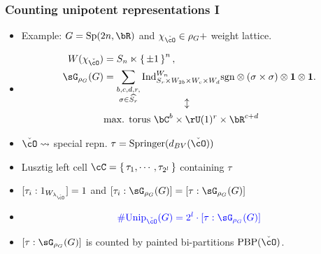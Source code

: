 \documentclass[t,11pt,usenames,dvipsnames]{beamer}
\theoremstyle{plain}
\theoremstyle{definition}
\newcommand{\bfone}{\mathbf{1}}
\def\sgn{{\rm sgn}}
\def\Ind{{\rm Ind}}
\def\Sp{{\mathrm{Sp}}}
\def\Unip{{\mathrm{Unip}}}
\def\ckcO{{\check{\cO}}}
\def\Nil{\mathrm{Nil}}
\def\lblue{\color{blue}}
\def\vcO{\check{\cO}}
\def\PBP{\mathrm{PBP}}
\def\LS{\mathrm{LS}}
\def\AOD{\mathrm{AOD}}
\def\Spr{\mathrm{Springer}}
\begin{document}
    \begin{frame}
        \frametitle{Counting unipotent representations I}
        \begin{itemize}[<+->]
            \item Example: $G = \Sp(2n,\bR)$ and  $\chi_{\ckcO}\in \rho_G +$ weight lattice. %

            \item[] \vspace{-1em} 
            \[
              \begin{split}
              W(\chi_{\ckcO}) &= S_n \ltimes \set{\pm 1}^n,\\ 
            \sG_{\rho_G}(G) &= \sum_{\substack{b,c,d,r,\\
            \sigma\in \widehat{S_r}}} \Ind_{S_r\times W_{2b}\times W_c\times
            W_d}^{W_n} \sgn\otimes(\sigma\times \sigma)\otimes \bfone\otimes \bfone .\\[-1em]
            & \hspace{8em}\updownarrow\\
            & \text{max. torus }\bC^b \times \rU(1)^r \times \bR^{c+d} 
              \end{split}
           \] 
            \item[] \vspace{-1em}$\ckcO\leadsto$ special repn. $\tau = \Spr(d_{BV}(\ckcO)) $ 
            \item[] Lusztig left cell $\cC = \set{\tau_1,
            \cdots,\tau_{2^l}}$ containing $\tau$
            \item $[\tau_i:1_{W_{\lambda_{\ckcO}}}]=1$ %
            and {\color{red}$[\tau_i:\sG_{\rho_G}(G)] = [\tau:\sG_{\rho_G}(G)]$}
            \item[]
            \vspace{-1em}
            \[
            \lblue
            \#\Unip_{\vcO}(G) = 2^l \cdot [\tau:\sG_{\rho_G}(G)] 
            \]
            \item \vspace{-1em}$[\tau:\sG_{\rho_G}(G)]$ is counted by painted bi-partitions $\PBP(\ckcO)$.
        \end{itemize}
    \end{frame}
\end{document}
